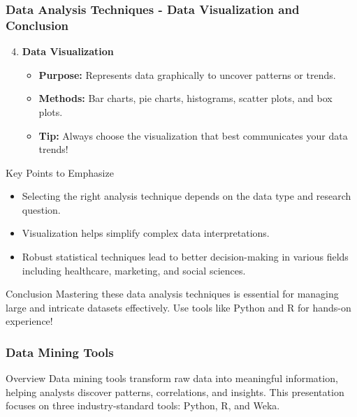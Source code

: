 \documentclass[aspectratio=169]{beamer}
\begin{document}
\begin{frame}[fragile]
    \frametitle{Data Analysis Techniques - Data Visualization and Conclusion}
    \begin{enumerate}
        \setcounter{enumi}{3}
        \item \textbf{Data Visualization}
        \begin{itemize}
            \item \textbf{Purpose:} Represents data graphically to uncover patterns or trends.
            \item \textbf{Methods:} Bar charts, pie charts, histograms, scatter plots, and box plots.
            \item \textbf{Tip:} Always choose the visualization that best communicates your data trends!
        \end{itemize}
    \end{enumerate}
    
    \begin{block}{Key Points to Emphasize}
        \begin{itemize}
            \item Selecting the right analysis technique depends on the data type and research question.
            \item Visualization helps simplify complex data interpretations.
            \item Robust statistical techniques lead to better decision-making in various fields including healthcare, marketing, and social sciences.
        \end{itemize}
    \end{block}

    \begin{block}{Conclusion}
        Mastering these data analysis techniques is essential for managing large and intricate datasets effectively. 
        Use tools like Python and R for hands-on experience!
    \end{block}
\end{frame}

\begin{frame}
    \frametitle{Data Mining Tools}
    \begin{block}{Overview}
        Data mining tools transform raw data into meaningful information, helping analysts discover patterns, correlations, and insights. This presentation focuses on three industry-standard tools: Python, R, and Weka.
    \end{block}
\end{frame}
\end{document}
